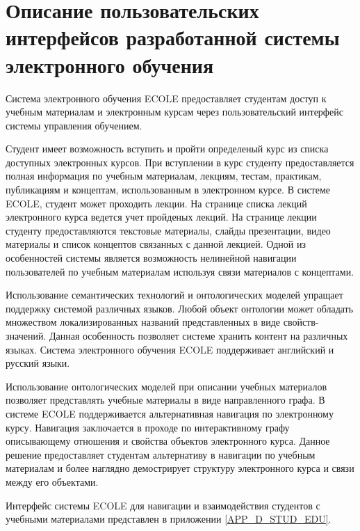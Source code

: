 \section{Описание пользовательских интерфейсов разработанной системы электронного обучения} \label{sect4_2}


Система электронного обучения ECOLE предоставляет студентам доступ к учебным материалам и электронным курсам через пользовательский интерфейс системы управления обучением. 

Студент имеет возможность вступить и пройти определеный курс из списка доступных электронных курсов. При вступлении в курс студенту предоставляется полная информация по учебным материалам, лекциям, тестам, практикам, публикациям и концептам, использованным в электронном курсе. В системе ECOLE, студент может проходить лекции. На странице списка лекций электронного курса ведется учет пройденых лекций. На странице лекции студенту предоставляются текстовые материалы, слайды презентации, видео материалы и список концептов связанных с данной лекцией. Одной из особенностей системы является возможность нелинейной навигации пользователей по учебным материалам используя связи материалов с концептами.

Использование семантических технологий и онтологических моделей упращает поддержку системой различных языков. Любой объект онтологии может обладать множеством локализированных названий представленных в виде свойств-значений. Данная особенность позволяет системе хранить контент на различных языках. Система электронного обучения ECOLE поддерживает английский и русский языки.

Использование онтологических моделей при описании учебных материалов позволяет представлять учебные материалы в виде направленного графа. В системе ECOLE поддерживается альтернативная навигация по электронному курсу. Навигация заключается в проходе по интерактивному графу описывающему отношения и свойства объектов электронного курса. Данное решение предоставляет студентам альтернативу в навигации по учебным материалам и более наглядно демострирует структуру электронного курса и связи между его объектами.

Интерфейс системы ECOLE для навигации и взаимодействия студентов с учебными материалами представлен в приложении \ref{APP_D_STUD_EDU}.

